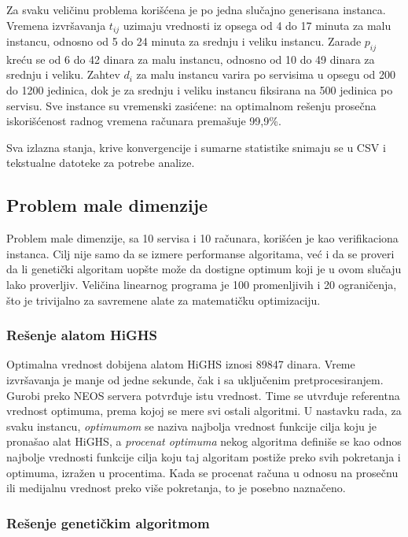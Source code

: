 \documentclass[12pt]{article}
\begin{document}
Za svaku veličinu problema korišćena je po jedna slučajno generisana instanca. Vremena izvršavanja $t_{ij}$ uzimaju vrednosti iz opsega od 4 do 17 minuta za malu instancu, odnosno od 5 do 24 minuta za srednju i veliku instancu. Zarade $p_{ij}$ kreću se od 6 do 42 dinara za malu instancu, odnosno od 10 do 49 dinara za srednju i veliku. Zahtev $d_i$ za malu instancu varira po servisima u opsegu od 200 do 1200 jedinica, dok je za srednju i veliku instancu fiksirana na 500 jedinica po servisu. Sve instance su vremenski zasićene: na optimalnom rešenju prosečna iskorišćenost radnog vremena računara premašuje 99{,}9\%.

Sva izlazna stanja, krive konvergencije i sumarne statistike snimaju se u CSV i tekstualne datoteke za potrebe analize.

\subsection{Problem male dimenzije}

Problem male dimenzije, sa 10 servisa i 10 računara, korišćen je kao verifikaciona instanca. Cilj nije samo da se izmere performanse algoritama, već i da se proveri da li genetički algoritam uopšte može da dostigne optimum koji je u ovom slučaju lako proverljiv. Veličina linearnog programa je 100 promenljivih i 20 ograničenja, što je trivijalno za savremene alate za matematičku optimizaciju.

\subsubsection{Rešenje alatom HiGHS}

Optimalna vrednost dobijena alatom HiGHS iznosi 89847 dinara. Vreme izvršavanja je manje od jedne sekunde, čak i sa uključenim pretprocesiranjem. Gurobi preko NEOS servera potvrđuje istu vrednost. Time se utvrđuje referentna vrednost optimuma, prema kojoj se mere svi ostali algoritmi. U nastavku rada, za svaku instancu, \emph{optimumom} se naziva najbolja vrednost funkcije cilja koju je pronašao alat HiGHS, a \emph{procenat optimuma} nekog algoritma definiše se kao odnos najbolje vrednosti funkcije cilja koju taj algoritam postiže preko svih pokretanja i optimuma, izražen u procentima. Kada se procenat računa u odnosu na prosečnu ili medijalnu vrednost preko više pokretanja, to je posebno naznačeno.

\subsubsection{Rešenje genetičkim algoritmom}
\end{document}
